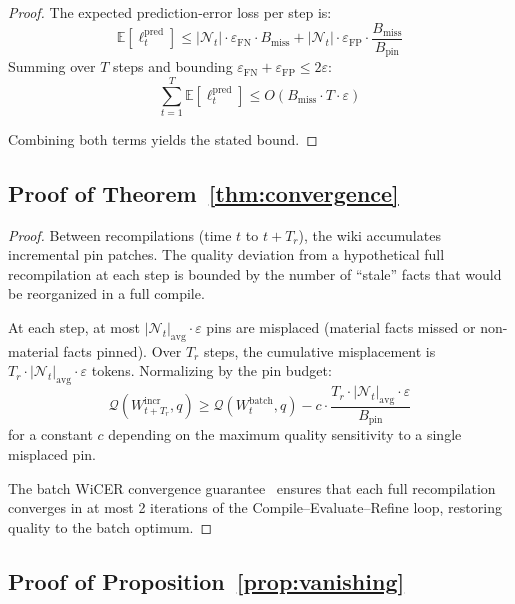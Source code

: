 \documentclass{article}
\newcommand{\nt}{\mathcal{N}_t}
\newcommand{\expect}{\mathbb{E}}
\begin{document}
\begin{proof}
The expected prediction-error loss per step is:
\begin{equation}
  \expect[\ell_t^{\text{pred}}] \leq |\nt| \cdot \varepsilon_{\text{FN}} \cdot B_{\text{miss}} + |\nt| \cdot \varepsilon_{\text{FP}} \cdot \frac{B_{\text{miss}}}{B_{\text{pin}}}
\end{equation}
Summing over $T$ steps and bounding $\varepsilon_{\text{FN}} + \varepsilon_{\text{FP}} \leq 2\varepsilon$:
\begin{equation}
  \sum_{t=1}^T \expect[\ell_t^{\text{pred}}] \leq O(B_{\text{miss}} \cdot T \cdot \varepsilon)
\end{equation}

Combining both terms yields the stated bound.
\end{proof}

\subsection{Proof of Theorem~\ref{thm:convergence}}

\begin{proof}
Between recompilations (time $t$ to $t + T_r$), the wiki accumulates incremental pin patches.
The quality deviation from a hypothetical full recompilation at each step is bounded by the number of ``stale'' facts that would be reorganized in a full compile.

At each step, at most $|\nt|_{\text{avg}} \cdot \varepsilon$ pins are misplaced (material facts missed or non-material facts pinned).
Over $T_r$ steps, the cumulative misplacement is $T_r \cdot |\nt|_{\text{avg}} \cdot \varepsilon$ tokens.
Normalizing by the pin budget:
\begin{equation}
  \mathcal{Q}(W_{t+T_r}^{\text{incr}}, q) \geq \mathcal{Q}(W_t^{\text{batch}}, q) - c \cdot \frac{T_r \cdot |\nt|_{\text{avg}} \cdot \varepsilon}{B_{\text{pin}}}
\end{equation}
for a constant $c$ depending on the maximum quality sensitivity to a single misplaced pin.

The batch WiCER convergence guarantee~\citep{huerta2026wicer} ensures that each full recompilation converges in at most 2 iterations of the Compile--Evaluate--Refine loop, restoring quality to the batch optimum.
\end{proof}

\subsection{Proof of Proposition~\ref{prop:vanishing}}
\end{document}
